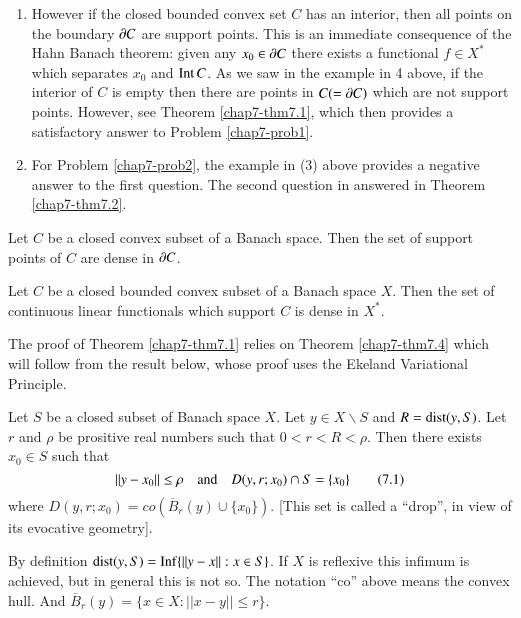 \begin{enumerate}
\item However if the closed bounded convex set $C$ has an interior,
  then all points on the boundary $\partial C$ are support points. This is
  an immediate consequence of the Hahn Banach theorem: given any
  $x_{0}\in \partial C$ there exists a functional $f\in X^{*}$ which
  separates $x_{0}$ and $\operatorname{Int} C$. As we saw in the example in 4 above,
  if the interior of $C$ is empty then there are points in $C(=\partial C)$
  which are not support points. However, see Theorem
  \ref{chap7-thm7.1}, which then provides a satisfactory answer to
  Problem \ref{chap7-prob1}.

\item For Problem \ref{chap7-prob2}, the example in (3) above provides
  a negative answer to the first question. The second question in
  answered in Theorem \ref{chap7-thm7.2}.
\end{enumerate}


\begin{theorem}\label{chap7-thm7.1}
Let $C$ be a closed convex subset of a Banach space. Then the set of
support points of $C$ are dense in $\partial C$.
\end{theorem}

\begin{theorem}\label{chap7-thm7.2}
Let $C$ be a closed bounded convex subset of a Banach space $X$. Then
the set of continuous linear functionals which support $C$ is dense in
$X^{*}$. 
\end{theorem}

The proof of Theorem \ref{chap7-thm7.1} relies on Theorem
\ref{chap7-thm7.4} which will follow from the result below, whose
proof uses the Ekeland Variational Principle.

\begin{theorem}\label{chap7-thm7.3}
Let $S$ be a closed subset of Banach space $X$. Let $y\in X\backslash
S$ and $R=\operatorname{dist} (y,S)$. Let $r$ and $\rho$ be prositive real numbers
such that $0<r<R<\rho$. Then there exists $x_{0}\in S$ such that
\begin{equation*}
||y-x_{0}||\leq \rho\quad\text{and}\quad D(y,r;x_{0})\cap
S=\{x_{0}\}\tag{7.1}\label{chap7-eq7.1} 
\end{equation*}
where $D(y,r;x_{0})=co(\overline{B}_{r}(y)\cup \{x_{0}\})$. [This set
  is called a ``drop'', in view of its evocative geometry].
\end{theorem}

\begin{remark*}
By definition $\operatorname{dist}(y,S)=\operatorname{Inf}\{||y-x||:x\in S\}$. If $X$ is reflexive
this infimum is achieved, but in general this is not so. The notation
``co'' above means the convex hull. And $\overline{B}_{r}(y)=\{x\in
X:||x-y||\leq r\}$.
\end{remark*}

